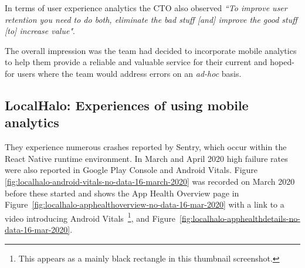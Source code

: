 In terms of user experience analytics the CTO also observed \emph{``To improve user retention you need to do both, eliminate the bad stuff [and] improve the good stuff [to] increase value"}.

The overall impression was the team had decided to incorporate mobile analytics to help them provide a reliable and valuable service for their current and hoped-for users where the team would address errors on an \emph{ad-hoc} basis.

\subsection{LocalHalo: Experiences of using mobile analytics}
They experience numerous crashes reported by Sentry, which occur within the React Native runtime environment. In March and April 2020 high failure rates were also reported in Google Play Console and Android Vitals. Figure \ref{fig:localhalo-android-vitals-no-data-16-march-2020} was recorded on  March 2020 before these started and shows the App Health Overview page in Figure~\ref{fig:localhalo-apphealthoverview-no-data-16-mar-2020} with a link to a video introducing Android Vitals~\footnote{This appears as a mainly black rectangle in this thumbnail screenshot.}, and Figure~\ref{fig:localhalo-apphealthdetails-no-data-16-mar-2020}.

